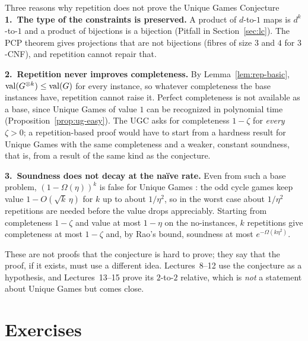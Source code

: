 \begin{bigpicture}{Three reasons why repetition does not prove the Unique Games Conjecture}
\textbf{1.\ The type of the constraints is preserved.}  A product of $d$-to-$1$ maps is $d^k$-to-$1$ and a product of bijections is a bijection (Pitfall in Section~\ref{sec:lc}).  The PCP theorem gives projections that are not bijections (fibres of size $3$ and $4$ for $3$-CNF), and repetition cannot repair that.

\smallskip
\textbf{2.\ Repetition never improves completeness.}  By Lemma~\ref{lem:rep-basic}, $\operatorname{val}(G^{\otimes k})\le\operatorname{val}(G)$ for every instance, so whatever completeness the base instances have, repetition cannot raise it.  Perfect completeness is not available as a base, since Unique Games of value $1$ can be recognized in polynomial time (Proposition~\ref{prop:ug-easy}).
The UGC asks for completeness $1-\zeta$ for \emph{every} $\zeta>0$; a repetition-based proof would have to start from a hardness result for Unique Games with the same completeness and a weaker, constant soundness, that is, from a result of the same kind as the conjecture.

\smallskip
\textbf{3.\ Soundness does not decay at the na\"ive rate.}  Even from such a base problem, $(1-\Omega(\eta))^k$ is false for Unique Games \citep{Raz11,FKO07}: the odd cycle games keep value $1-O(\sqrt k\,\eta)$ for $k$ up to about $1/\eta^2$, so in the worst case about $1/\eta^2$ repetitions are needed before the value drops appreciably.
Starting from completeness $1-\zeta$ and value at most $1-\eta$ on the no-instances, $k$ repetitions give completeness at most $1-\zeta$ and, by Rao's bound, soundness at most $e^{-\Omega(k\eta^2)}$.

\smallskip
These are not proofs that the conjecture is hard to prove; they say that the proof, if it exists, must use a different idea.  Lectures~8--12 use the conjecture as a hypothesis, and Lectures~13--15 prove its $2$-to-$2$ relative, which is \emph{not} a statement about Unique Games but comes close.
\end{bigpicture}


\section*{Exercises}

